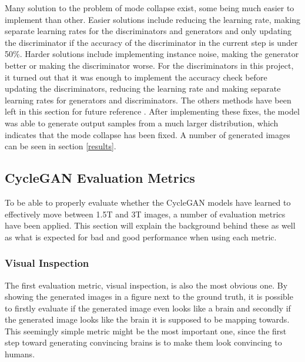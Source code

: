 \documentclass[11pt, fleqn, titlepage]{article}
\newcommand{\1}[1]{\mathds{1}\left[#1\right]}
\begin{document}
Many solution to the problem of mode collapse exist, some being much easier to implement than other. Easier solutions include reducing the learning rate, making separate learning rates for the discriminators and generators and only updating the discriminator if the accuracy of the discriminator in the current step is under 50\%. Harder solutions include implementing instance noise, making the generator better or making the discriminator worse. For the discriminators in this project, it turned out that it was enough to implement the accuracy check before updating the discriminators, reducing the learning rate and making separate learning rates for generators and discriminators. The others methods have been left in this section for future reference \cite{mode_collapse_reddit_fix}\cite{mode_collapse_github}. After implementing these fixes, the model was able to generate output samples from a much larger distribution, which indicates that the mode collapse has been fixed. A number of generated images can be seen in section \ref{results}.


\subsection{CycleGAN Evaluation Metrics}\label{evaluation_metrics}
To be able to properly evaluate whether the CycleGAN models have learned to effectively move between 1.5T and 3T images, a number of evaluation metrics have been applied. This section will explain the background behind these as well as what is expected for bad and good performance when using each metric.

\subsubsection{Visual Inspection}\label{visual_inspection}
The first evaluation metric, visual inspection, is also the most obvious one. By showing the generated images in a figure next to the ground truth, it is possible to firstly evaluate if the generated image even looks like a brain and secondly if the generated image looks like the brain it is supposed to be mapping towards. This seemingly simple metric might be the most important one, since the first step toward generating convincing brains is to make them look convincing to humans.
\end{document}
